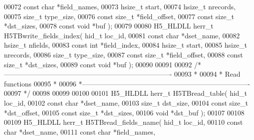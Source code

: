 \begin{DoxyCode}
00072                               \textcolor{keyword}{const} \textcolor{keywordtype}{char} *field\_names,
00073                               hsize\_t start,
00074                               hsize\_t nrecords,
00075                               \textcolor{keywordtype}{size\_t} type\_size,
00076                               \textcolor{keyword}{const} \textcolor{keywordtype}{size\_t} *field\_offset,
00077                               \textcolor{keyword}{const} \textcolor{keywordtype}{size\_t} *dst\_sizes,
00078                               \textcolor{keyword}{const} \textcolor{keywordtype}{void} *buf );
00079 
00080 H5\_HLDLL herr\_t  H5TBwrite\_fields\_index( hid\_t loc\_id,
00081                                \textcolor{keyword}{const} \textcolor{keywordtype}{char} *dset\_name,
00082                                hsize\_t nfields,
00083                                \textcolor{keyword}{const} \textcolor{keywordtype}{int} *field\_index,
00084                                hsize\_t start,
00085                                hsize\_t nrecords,
00086                                \textcolor{keywordtype}{size\_t} type\_size,
00087                                \textcolor{keyword}{const} \textcolor{keywordtype}{size\_t} *field\_offset,
00088                                \textcolor{keyword}{const} \textcolor{keywordtype}{size\_t} *dst\_sizes,
00089                                \textcolor{keyword}{const} \textcolor{keywordtype}{void} *buf );
00090 
00091 
00092 \textcolor{comment}{/*-------------------------------------------------------------------------}
00093 \textcolor{comment}{ *}
00094 \textcolor{comment}{ * Read functions}
00095 \textcolor{comment}{ *}
00096 \textcolor{comment}{ *-------------------------------------------------------------------------}
00097 \textcolor{comment}{ */}
00098 
00099 
00100 
00101 H5\_HLDLL herr\_t  H5TBread\_table( hid\_t loc\_id,
00102                        \textcolor{keyword}{const} \textcolor{keywordtype}{char} *dset\_name,
00103                        \textcolor{keywordtype}{size\_t} dst\_size,
00104                        \textcolor{keyword}{const} \textcolor{keywordtype}{size\_t} *dst\_offset,
00105                        \textcolor{keyword}{const} \textcolor{keywordtype}{size\_t} *dst\_sizes,
00106                        \textcolor{keywordtype}{void} *dst\_buf );
00107 
00108 
00109 H5\_HLDLL herr\_t  H5TBread\_fields\_name( hid\_t loc\_id,
00110                              \textcolor{keyword}{const} \textcolor{keywordtype}{char} *dset\_name,
00111                              \textcolor{keyword}{const} \textcolor{keywordtype}{char} *field\_names,

\end{DoxyCode}
